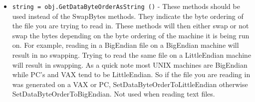 \begin{itemize}
\item  \verb|string = obj.GetDataByteOrderAsString ()| -  These methods should be used instead of the SwapBytes methods.
 They indicate the byte ordering of the file you are trying
 to read in. These methods will then either swap or not swap
 the bytes depending on the byte ordering of the machine it is
 being run on. For example, reading in a BigEndian file on a
 BigEndian machine will result in no swapping. Trying to read
 the same file on a LittleEndian machine will result in swapping.
 As a quick note most UNIX machines are BigEndian while PC's
 and VAX tend to be LittleEndian. So if the file you are reading
 in was generated on a VAX or PC, SetDataByteOrderToLittleEndian 
 otherwise SetDataByteOrderToBigEndian. Not used when reading
 text files. 

\end{itemize}
